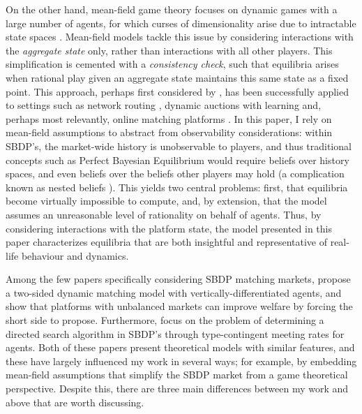 On the other hand, mean-field game theory focuses on dynamic games with a large number of agents, for which curses of dimensionality arise due to intractable state spaces \citep{light2022mean}. 
Mean-field models tackle this issue by considering interactions with the \textit{aggregate state} only, rather than interactions with all other players.
This simplification is cemented with a \textit{consistency check}, such that equilibria arises when rational play given an aggregate state maintains this same state as a fixed point. 
This approach, perhaps first considered by \cite{jovanovic1988anonymous}, has been successfully applied to settings such as network routing \citep{calderone2017markov}, dynamic auctions with learning \citep{iyer2014mean} and, perhaps most relevantly, online matching platforms \citep{kanoria2021facilitating,immorlica2021designing}.
In this paper, I rely on mean-field assumptions to abstract from observability considerations: within SBDP's, the market-wide history is unobservable to players, and thus traditional concepts such as Perfect Bayesian Equilibrium would require beliefs over history spaces, and even beliefs over the beliefs other players may hold (a complication known as nested beliefs \citep{brandenburger1993hierarchies}).
This yields two central problems: first, that equilibria become virtually impossible to compute, and, by extension, that the model assumes an unreasonable level of rationality on behalf of agents.
Thus, by considering interactions with the platform state, the model presented in this paper characterizes equilibria that are both insightful and representative of real-life behaviour and dynamics. 

Among the few papers specifically considering SBDP matching markets, \cite{kanoria2021facilitating} propose a two-sided dynamic matching model with vertically-differentiated agents, and show that platforms with unbalanced markets can improve welfare by forcing the short side to propose. 
Furthermore, \cite{immorlica2021designing} focus on the problem of determining a directed search algorithm in SBDP's through type-contingent meeting rates for agents. 
Both of these papers present theoretical models with similar features, and these have largely influenced my work in several ways; for example, by embedding mean-field assumptions that simplify the SBDP market from a game theoretical perspective. 
Despite this, there are three main differences between my work and above that are worth discussing. 


